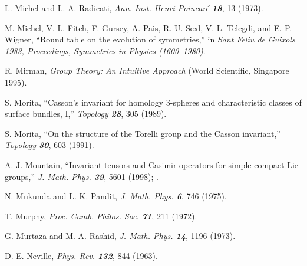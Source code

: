 L. Michel and L. A. Radicati,
{\em Ann. Inst. Henri Poincar{\'e}  \bf 18}, 13 (1973).

M. Michel, V. L. Fitch, F. Gursey, A. Pais, R. U. Sexl, V. L. Telegdi,
and E. P. Wigner,
``Round table on the evolution of symmetries,''
in {\em Sant Feliu de Guixols 1983, Proceedings, Symmetries in Physics %
(1600--1980)}.

 R. Mirman,
    {\em Group Theory: An Intuitive Approach}
    (World Scientific, Singapore 1995).




 S. Morita,
``Casson's invariant for homology
$3$-spheres and characteristic classes of surface bundles, {I},''
    {\em Topology  \bf 28}, 305 (1989).  %

 S. Morita,
``On the structure of the Torelli group and the Casson invariant,''
    {\em Topology  \bf 30}, 603 (1991). %

%
 A. J. Mountain,
``Invariant tensors and Casimir operators for simple compact Lie groups,''
{\em J. Math. Phys. \bf 39}, 5601 (1998);
.


N. Mukunda and L. K. Pandit,
{\em J. Math. Phys.  \bf 6}, 746 (1975).

T. Murphy,
{\em Proc. Camb. Philos. Soc. \bf 71}, 211 (1972).

 G. Murtaza and M. A. Rashid,
{\em J. Math. Phys. \bf 14}, 1196 (1973).



D. E. Neville,
{\em Phys. Rev.  \bf 132}, 844 (1963).

